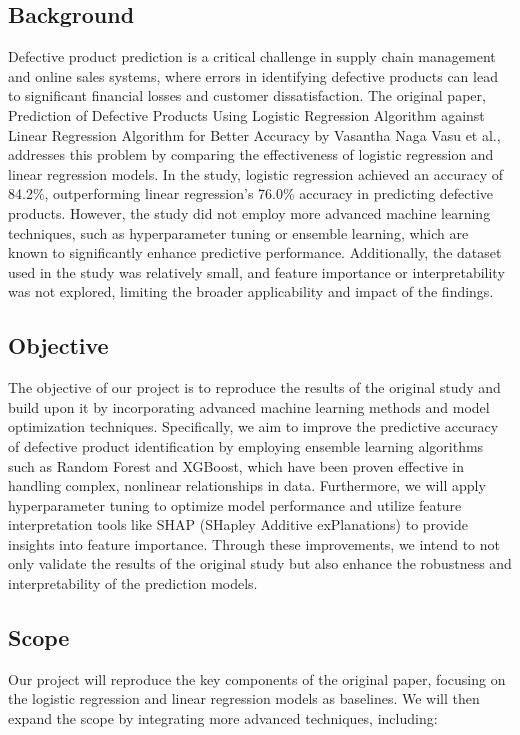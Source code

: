 \documentclass[conference]{IEEEtran}
\begin{document}
\subsection{Background}
Defective product prediction is a critical challenge in supply chain management and online sales systems, where errors in identifying defective products can lead to significant financial losses and customer dissatisfaction. The original paper, Prediction of Defective Products Using Logistic Regression Algorithm against Linear Regression Algorithm for Better Accuracy by Vasantha Naga Vasu et al., addresses this problem by comparing the effectiveness of logistic regression and linear regression models. In the study, logistic regression achieved an accuracy of 84.2\%, outperforming linear regression's 76.0\% accuracy in predicting defective products. However, the study did not employ more advanced machine learning techniques, such as hyperparameter tuning or ensemble learning, which are known to significantly enhance predictive performance. Additionally, the dataset used in the study was relatively small, and feature importance or interpretability was not explored, limiting the broader applicability and impact of the findings.

\subsection{Objective}
The objective of our project is to reproduce the results of the original study and build upon it by incorporating advanced machine learning methods and model optimization techniques. Specifically, we aim to improve the predictive accuracy of defective product identification by employing ensemble learning algorithms such as Random Forest and XGBoost, which have been proven effective in handling complex, nonlinear relationships in data. Furthermore, we will apply hyperparameter tuning to optimize model performance and utilize feature interpretation tools like SHAP (SHapley Additive exPlanations) to provide insights into feature importance. Through these improvements, we intend to not only validate the results of the original study but also enhance the robustness and interpretability of the prediction models.
\subsection{Scope}
Our project will reproduce the key components of the original paper, focusing on the logistic regression and linear regression models as baselines. We will then expand the scope by integrating more advanced techniques, including:
\end{document}
